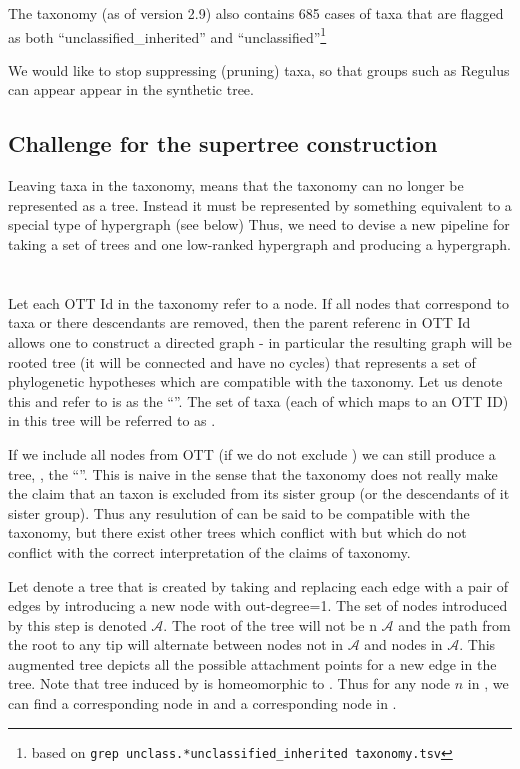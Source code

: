 \documentclass[11pt]{article}
\begin{document}
The taxonomy (as of version 2.9) also contains 685 cases of taxa that are flagged as both
    ``unclassified\_inherited'' and  ``unclassified''\footnote{based on {\tt grep unclass.*unclassified\_inherited taxonomy.tsv}}

We would like to stop suppressing (pruning) \insed taxa, so that groups such as Regulus can appear
    appear in the synthetic tree.

\subsection{Challenge for the supertree construction}
Leaving \insed taxa in the taxonomy, means that the taxonomy can no longer be represented as 
    a tree.
Instead it must be represented by something equivalent to a special type of hypergraph (see below)
Thus, we need to devise a new pipeline for taking a set of trees and one low-ranked hypergraph and
    producing a hypergraph.

\section{\specialHypergraph}
Let each OTT Id in the taxonomy refer to a node.
If all nodes that correspond to \insed taxa or there descendants are removed,
    then the parent referenc in OTT Id allows one to construct 
    a directed graph - in particular the resulting graph will be rooted tree (it will be connected
    and have no cycles) that represents a set of phylogenetic hypotheses  which are compatible
    with the taxonomy.
Let us denote this \placedTaxoTree and refer to is as the ``\placedTaxoTreeName''.
The set of taxa (each of which maps to an OTT ID) in this tree will be referred to as \placedTaxa.

If we include all nodes from OTT (if we do not exclude \insed) we can still produce
    a tree,  \naiveFullTree, the ``\naiveFullTreeName''.
This is naive in the sense that the taxonomy does not really make the claim that an \insed
    taxon is excluded from its sister group (or the descendants of it sister group). 
Thus any resulution of \naiveFullTree can be said to be compatible with the taxonomy, but there
    exist other trees which conflict with \naiveFullTree but which do not conflict with
    the correct interpretation of the claims of taxonomy.

Let \augmentedFullTree denote a tree that is created by taking \naiveFullTree and replacing each
    edge with a pair of edges by introducing a new node with out-degree=1.
The set of nodes introduced by this step is denoted $\mathcal{A}$.
The root of the tree will not be n $\mathcal{A}$ and the path from the root to any tip will alternate
    between nodes not in $\mathcal{A}$ and nodes in $\mathcal{A}$.
This augmented tree depicts all the possible attachment points for a new edge in the tree.
Note that \naiveFullTree tree induced by \placedTaxa is homeomorphic to \placedTaxoTree.
Thus for any node $n$ in \placedTaxoTree, we can find a corresponding node 
   in \naiveFullTree and a corresponding node
    in \augmentedFullTree.
\end{document}
